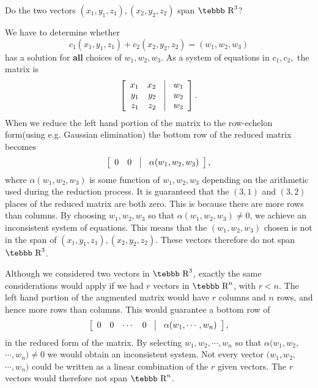 \begin{example}
\label{exam5.span2}
Do the two vectors {$(x_1,y_1,z_1),(x_2,y_2,z_2)$} span $\mbox{\tebbb R}^3$?

We have to determine whether
$$c_1(x_1,y_1,z_1)+c_2(x_2,y_2,z_2)=(w_1,w_2,w_3)$$
has a solution for {\bf all} choices of $w_1,w_2,w_3$.  As a system
of equations in $c_1,c_2,$ the matrix is
$$\left [\begin{array}{rrcr} x_1&x_2&\vline&w_1\\
y_1&y_2&\vline&w_2\\
z_1&z_2&\vline&w_3\end{array}\right].$$
When we reduce the left hand portion of the matrix
to the row-echelon form(using e.g. Gaussian elimination) the bottom row of the reduced matrix becomes
$$\left [\begin{array}{rrcr} 0&0&\vline&\alpha(w_1,w_2,w_3)\end{array}\right],$$
where $\alpha(w_1,w_2,w_3)$ is some function of $w_1,w_2,w_3$ depending on the arithmetic used during the reduction process.  It is guaranteed that the $(3,1)$ and $(3,2)$ places of the reduced matrix are both zero.  This is because there are more rows than columns.  By choosing $w_1,w_2,w_3$ so that $\alpha(w_1,w_2,w_3) \neq 0$, we achieve an inconsistent system of equations.  This means that the $(w_1,w_2,w_3)$ chosen is not in the span of
{$(x_1,y_1,z_1),(x_2,y_2,z_2)$}.  These vectors therefore do not span $\mbox{\tebbb R}^3$.
\end{example}

Although we considered two vectors in $\mbox{\tebbb R}^3$, exactly the same considerations would apply if we had $r$ vectors in $\mbox{\tebbb R}^n$, with $r<n$.  The left hand portion of the augmented matrix would have $r$ columns and $n$ rows, and hence more rows than columns.  This would guarantee a bottom row of
$$\left [\begin{array}{rrrrcr} 0&0&\cdots&0&\vline&\alpha(w_1,\cdots,w_n)\end{array}\right],$$
in the reduced form of the matrix.  By selecting $w_1,w_2,\cdots,w_n$ so that $\alpha(w_1,w_2, $ \\ $\cdots,w_n)\neq 0$ we would obtain an inconsistent system.  Not every vector $(w_1,w_2,$\\$\cdots,w_n)$ could be written as a linear combination of the $r$ given vectors.  The $r$ vectors would therefore not span $\mbox{\tebbb R}^n$.

